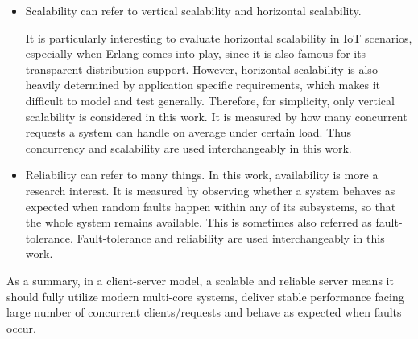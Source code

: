 \begin{itemize}

\item Scalability can refer to vertical scalability and horizontal scalability. %

It is particularly interesting to evaluate horizontal scalability in IoT scenarios, especially when Erlang comes into play, since it is also famous for its transparent distribution support. However, horizontal scalability is also heavily determined by application specific requirements, which makes it difficult to model and test generally. Therefore, for simplicity, only vertical scalability is considered in this work. It is measured by how many concurrent requests a system can handle on average under certain load. Thus concurrency and scalability are used interchangeably in this work.

\item Reliability can refer to many things. In this work, availability is more a research interest. It is measured by observing whether a system behaves as expected when random faults happen within any of its subsystems, so that the whole system remains available. This is sometimes also referred as fault-tolerance. Fault-tolerance and reliability are used interchangeably in this work.

\end{itemize}



As a summary, in a client-server model, a scalable and reliable server means it should fully utilize modern multi-core systems, deliver stable performance facing large number of concurrent clients/requests and behave as expected when faults occur.



